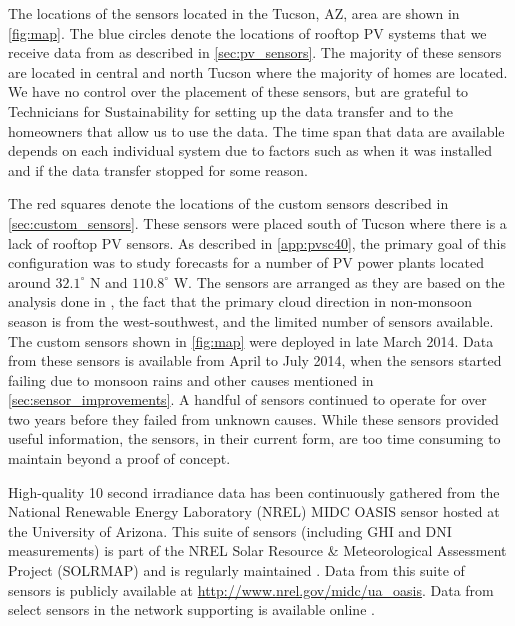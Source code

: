 The locations of the sensors located in the Tucson, AZ, area are shown
in \cref{fig:map}.
The blue circles denote the locations of rooftop PV systems that we
receive data from as described in \cref{sec:pv_sensors}.
The majority of these sensors are located in central and north Tucson
where the majority of homes are located.
We have no control over the placement of these sensors, but are
grateful to Technicians for Sustainability for setting up the data
transfer and to the homeowners that allow us to use the data.
The time span that data are available depends on each individual
system due to factors such as when it was installed and if the data
transfer stopped for some reason.

The red squares denote the locations of the custom sensors described
in \cref{sec:custom_sensors}.
These sensors were placed south of Tucson where there is a lack of
rooftop PV sensors.
As described in \cref{app:pvsc40}, the primary goal of this
configuration was to study forecasts for a number of PV power plants
located around $32.1^\circ$ N and $110.8^\circ$ W.
The sensors are arranged as they are based on the analysis done in
\cite{Lonij2013}, the fact that the primary cloud direction in
non-monsoon season is from the west-southwest, and the limited
number of sensors available.
The custom sensors shown in \cref{fig:map} were deployed in late March
2014.
Data from these sensors is available from April to July 2014, when the
sensors started failing due to monsoon rains and other causes
mentioned in \cref{sec:sensor_improvements}.
A handful of sensors continued to operate for over two years before
they failed from unknown causes.
While these sensors provided useful information, the sensors, in their
current form, are too time consuming to maintain beyond a proof of
concept.

High-quality 10 second irradiance data has been continuously gathered
from the National Renewable Energy Laboratory (NREL) MIDC OASIS sensor
hosted at the University of Arizona.
This suite of sensors (including GHI and DNI measurements) is part of
the NREL Solar Resource \& Meteorological Assessment Project (SOLRMAP)
and is regularly maintained \citep{Wilcox_Andreas_2010}.
Data from this suite of sensors is publicly available at
\url{http://www.nrel.gov/midc/ua_oasis}.
Data from select sensors in the network supporting
\cite{Lorenzo2015c,Lorenzo2017} is available online
\citep{Lorenzo2015b,Lorenzo2016b}.


